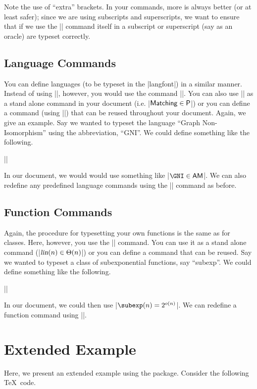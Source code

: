 \documentclass{ltxdoc}
\begin{document}
Note the use of ``extra'' brackets.  In your commands, more is
always better (or at least safer); since we are using subscripts and
superscripts, we want to ensure that if we use the |\ModkL| command
itself in a subscript or superscript (say as an oracle) are typeset
correctly.

\subsection{Language Commands}

You can define languages (to be typeset in the |langfont|) in a
similar manner.  Instead of using |\newclass|, however, you would
use the command |\newlang|.  You can also use |\lang| as a stand
alone command in your document (i.e. |${\mathsf{Matching}} \in {\ensuremath{\mathsf{P}}}$|) or
you can define a command (using |\lang|) that can be reused
throughout your document. Again, we give an example.  Say we wanted
to typeset the language ``Graph Non-Isomorphism'' using the
abbreviation, ``GNI''. We could define something like the following.

||

In our document, we would would use something like |$\GNI \in \AM$|.
We can also redefine any predefined language commands using the
|\renewlang| command as before.

\subsection{Function Commands}

Again, the procedure for typesetting your own functions is the same
as for classes.  Here, however, you use the |\func| command.  You
can use it as a stand alone command (|${\textsl{lin}}(n) \in \Theta(n)$|) %
or you can define a command that can be reused.  Say we wanted to
typeset a class of subexponential functions, say ``subexp''. We
could define something like the following.

||

In our document, we could then use |$\subexp(n) = 2^{o(n)}$|. We can
redefine a function command using |\renewfunc|.

\section{Extended Example}

Here, we present an extended example using the package.  Consider
the following \TeX\ code.
\end{document}
